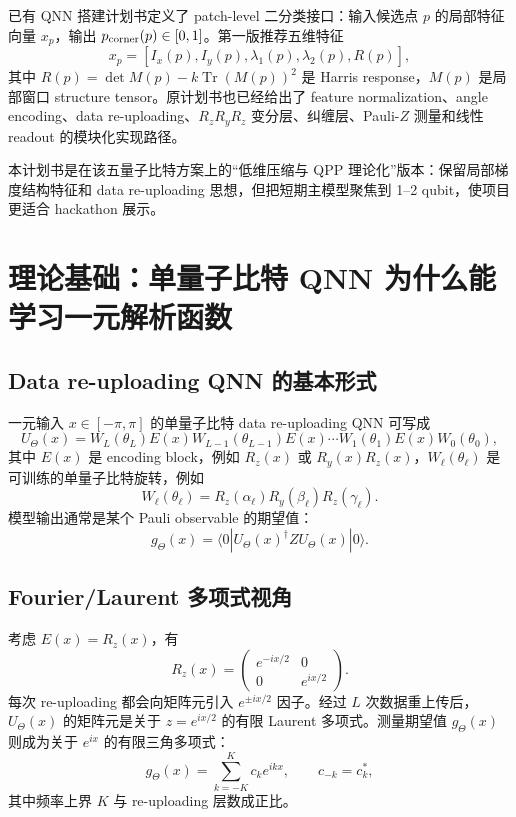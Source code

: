 \documentclass[UTF8,zihao=-4]{ctexart}
\newcommand{\Tr}{\operatorname{Tr}}
\begin{document}
已有 QNN 搭建计划书定义了 patch-level 二分类接口：输入候选点 $p$ 的局部特征向量 $x_p$，输出 $p_{\rm corner}(p)\in[0,1]$。第一版推荐五维特征
\begin{equation}
    x_p=[I_x(p),I_y(p),\lambda_1(p),\lambda_2(p),R(p)],
\end{equation}
其中 $R(p)=\det M(p)-k\Tr(M(p))^2$ 是 Harris response，$M(p)$ 是局部窗口 structure tensor。原计划书也已经给出了 feature normalization、angle encoding、data re-uploading、$R_zR_yR_z$ 变分层、纠缠层、Pauli-$Z$ 测量和线性 readout 的模块化实现路径。

本计划书是在该五量子比特方案上的“低维压缩与 QPP 理论化”版本：保留局部梯度结构特征和 data re-uploading 思想，但把短期主模型聚焦到 1--2 qubit，使项目更适合 hackathon 展示。

\section{理论基础：单量子比特 QNN 为什么能学习一元解析函数}

\subsection{Data re-uploading QNN 的基本形式}

一元输入 $x\in[-\pi,\pi]$ 的单量子比特 data re-uploading QNN 可写成
\begin{equation}
    U_\Theta(x)
    = W_L(\theta_L) E(x) W_{L-1}(\theta_{L-1})E(x)\cdots W_1(\theta_1)E(x)W_0(\theta_0),
\end{equation}
其中 $E(x)$ 是 encoding block，例如 $R_z(x)$ 或 $R_y(x)R_z(x)$，$W_\ell(\theta_\ell)$ 是可训练的单量子比特旋转，例如
\begin{equation}
    W_\ell(\theta_\ell)=R_z(\alpha_\ell)R_y(\beta_\ell)R_z(\gamma_\ell).
\end{equation}
模型输出通常是某个 Pauli observable 的期望值：
\begin{equation}
    g_\Theta(x)=\langle 0|U_\Theta(x)^\dagger Z U_\Theta(x)|0\rangle.
\end{equation}

\subsection{Fourier/Laurent 多项式视角}

考虑 $E(x)=R_z(x)$，有
\begin{equation}
    R_z(x)=\begin{pmatrix}
        e^{-ix/2} & 0 \\
        0 & e^{ix/2}
    \end{pmatrix}.
\end{equation}
每次 re-uploading 都会向矩阵元引入 $e^{\pm ix/2}$ 因子。经过 $L$ 次数据重上传后，$U_\Theta(x)$ 的矩阵元是关于 $z=e^{ix/2}$ 的有限 Laurent 多项式。测量期望值 $g_\Theta(x)$ 则成为关于 $e^{ix}$ 的有限三角多项式：
\begin{equation}
    g_\Theta(x)=\sum_{k=-K}^{K} c_k e^{ikx},
    \qquad c_{-k}=c_k^*,
\end{equation}
其中频率上界 $K$ 与 re-uploading 层数成正比。
\end{document}
